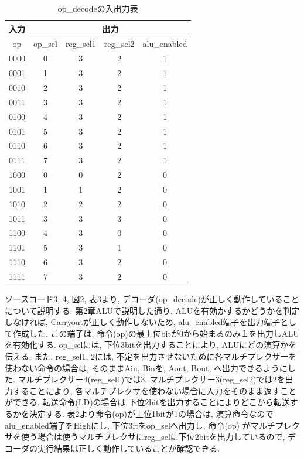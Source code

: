 \documentclass[12pt]{jreport}
\begin{document}
        \begin{table}[htb]
          \begin{center}
            \caption{op\_decodeの入出力表}
            \begin{tabular} {|c|c|c|c|c|} \hline
              入力 & \multicolumn{4}{|c|}{出力} \\ \hline \hline
                op & op\_sel & reg\_sel1 & reg\_sel2 & alu\_enabled \\ \hline
                0000 & 0 & 3 & 2 & 1 \\ \hline
                0001 & 1 & 3 & 2 & 1 \\ \hline
                0010 & 2 & 3 & 2 & 1 \\ \hline
                0011 & 3 & 3 & 2 & 1 \\ \hline

                0100 & 4 & 3 & 2 & 1 \\ \hline
                0101 & 5 & 3 & 2 & 1 \\ \hline
                0110 & 6 & 3 & 2 & 1 \\ \hline
                0111 & 7 & 3 & 2 & 1 \\ \hline

                1000 & 0 & 0 & 2 & 0 \\ \hline
                1001 & 1 & 1 & 2 & 0 \\ \hline
                1010 & 2 & 2 & 2 & 0 \\ \hline
                1011 & 3 & 3 & 3 & 0 \\ \hline

                1100 & 4 & 3 & 0 & 0 \\ \hline
                1101 & 5 & 3 & 1 & 0 \\ \hline
                1110 & 6 & 3 & 2 & 0 \\ \hline
                1111 & 7 & 3 & 2 & 0 \\ \hline

            \end{tabular}
          \end{center}
        \end{table}


        ソースコード3, 4, 図2, 表3より, デコーダ(op\_decode)が正しく動作していることについて説明する. 
        第2章ALUで説明した通り, ALUを有効かするかどうかを判定しなければ, Carryoutが正しく動作しないため, alu\_enabled端子を出力端子として作成した. この端子は, 命令(op)の最上位bitが0から始まるのみ１を出力しALUを有効化する. op\_selには, 下位3bitを出力することにより, ALUにどの演算かを伝える. また, reg\_sel1, 2には, 不定を出力させないために各マルチプレクサーを使わない命令の場合は, そのままAin, Binを, Aout, Bout, へ出力できるようにした. マルチプレクサー4(reg\_sel1)では3, マルチプレクサー3(reg\_sel2)では2を出力することにより, 各マルチプレクサを使わない場合に入力をそのまま返すことができる. 転送命令(LD)の場合は 下位2bitを出力することによりどこから転送するかを決定する. 表2より命令(op)が上位1bitが1の場合は, 演算命令なのでalu\_enabled端子をHighにし, 下位3itをop\_selへ出力し, 命令(op)
        がマルチプレクサを使う場合は使うマルチプレクサにreg\_selに下位2bitを出力しているので, デコーダの実行結果は正しく動作していることが確認できる. 
\end{document}
